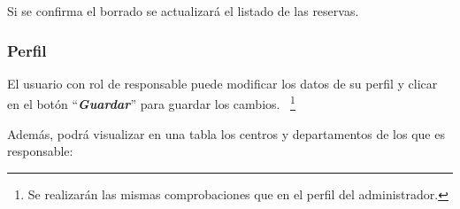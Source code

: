 Si se confirma el borrado se actualizará el listado de las reservas.


\subsubsection{Perfil}
El usuario con rol de responsable puede modificar los datos de su perfil y clicar en el botón ``\textbf{\textit{Guardar}}'' para guardar los cambios. ~\footnote{Se realizarán las mismas comprobaciones que en el perfil del administrador.}

Además, podrá visualizar en una tabla los centros y departamentos de los que es responsable:

